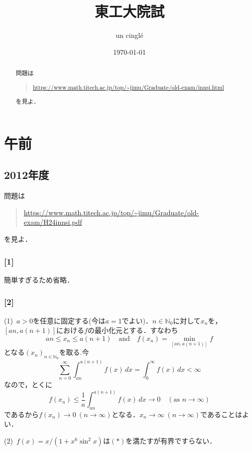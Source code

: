 \documentclass[a4j]{ltjsarticle}
\newcommand{\Nset}{\mathbb{N}}
\newcommand{\1}{\mathbbm{1}}
\numberwithin{equation}{section}
\theoremstyle{definition}
\begin{document}
\title{東工大院試}
\author{un cinglé}
\date{\today}
\maketitle
\begin{abstract}
    問題は
    \begin{quote}
        \url{https://www.math.titech.ac.jp/top/~jimu/Graduate/old-exam/innsi.html}
    \end{quote}
    を見よ．
\end{abstract}
\tableofcontents

\newpage 

\section{午前}
\subsection{2012年度}
問題は
\begin{quote}
    \url{https://www.math.titech.ac.jp/top/~jimu/Graduate/old-exam/H24innsi.pdf}
\end{quote}
を見よ．
\subsubsection*{[1]}
簡単すぎるため省略．
\subsubsection*{[2]}
(1)\ $a>0$を任意に固定する(今は$a=1$でよい)．$n\in\Nset_0$に対して$x_n$を，$[an,a(n+1)]$における$f$の最小化元とする．すなわち
\begin{equation}
    an\leq x_n\leq a(n+1)\quad \text{and}\quad f(x_n)=\min_{[an,a(n+1)]}f 
\end{equation}
となる$(x_n)_{n\in\Nset_{0}}$を取る.今
\begin{equation}
    \sum_{n=0}^\infty \int_{an}^{a(n+1)}f(x)\,dx=\int_{0}^\infty f(x)\,dx<\infty 
\end{equation}
なので，とくに
\begin{equation}
    f(x_n)\leq \frac{1}{a}\int_{an}^{a(n+1)}f(x)\,dx\to 0\quad (\text{as $n\to\infty $})
\end{equation}
であるから$f(x_n)\to0\ (n\to\infty)$となる．$x_n\to\infty\ (n\to\infty)$であることはよい．

(2)\ $f(x)=x/(1+x^6\sin^2 x)$は$(\ast)$を満たすが有界ですらない．
\end{document}
